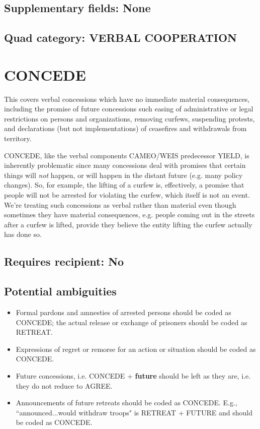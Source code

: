 \documentclass[11pt]{report}
\newcommand{\plcat}[1]{\textsf{#1}}
\newcommand{\plcon}[1]{\textbf{#1}}
\newcommand{\ti}[1]{\textit{#1}}
\begin{document}
\subsection{Supplementary fields: None}


\subsection{Quad category: VERBAL COOPERATION}


\newpage

\section{CONCEDE}

This covers verbal concessions which have no immediate material consequences, including the promise of future concessions such easing of administrative or legal restrictions on persons and organizations, removing curfews, suspending protests, and declarations (but not implementations) of ceasefires and withdrawals from territory.

\plcat{CONCEDE}, like the verbal components CAMEO/WEIS predecessor \plcat{YIELD}, is inherently problematic since many concessions deal with promises that certain things will \ti{not} happen, or will happen in the distant future (e.g. many policy changes). So, for example, the lifting of a curfew is, effectively, a promise that people will not be arrested for violating the curfew, which itself is not an event. We're treating such concessions as verbal rather than material even though sometimes they have material consequences, e.g. people coming out in the streets after a curfew is lifted, provide they believe the entity lifting the curfew actually has done so.

\subsection{Requires recipient: No}

\subsection{Potential ambiguities}

\begin{itemize}
\item Formal pardons and amnesties of arrested persons should be coded as \plcat{CONCEDE}; the actual release  or exchange of prisoners should be coded as \plcat{RETREAT}.
\item Expressions of regret or remorse for an action or situation should be coded as \plcat{CONCEDE}.
\item Future concessions, i.e. \plcat{CONCEDE} + \plcon{future} should be left as they are, i.e. they do not reduce to \plcat{AGREE}.
\item Announcements of future retreats should be coded as \plcat{CONCEDE}. E.g., ``announced...would withdraw troops" is \plcat{RETREAT} + \plcat{FUTURE} and should be coded as \plcat{CONCEDE}.
\end{itemize}
\end{document}
